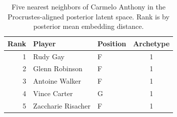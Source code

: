 \begin{table}[htbp]
  \centering\small
  \begin{tabular}{rllc}
    \toprule
    Rank & Player & Position & Archetype \\
    \midrule
    1 & Rudy Gay & F & 1 \\
    2 & Glenn Robinson & F & 1 \\
    3 & Antoine Walker & F & 1 \\
    4 & Vince Carter & G & 1 \\
    5 & Zaccharie Risacher & F & 1 \\
    \bottomrule
  \end{tabular}
  \caption{Five nearest neighbors of Carmelo Anthony in the Procrustes-aligned posterior latent space. Rank is by posterior mean embedding distance.}
  \label{tab:Carmelo_Anthony_neighbors}
\end{table}

